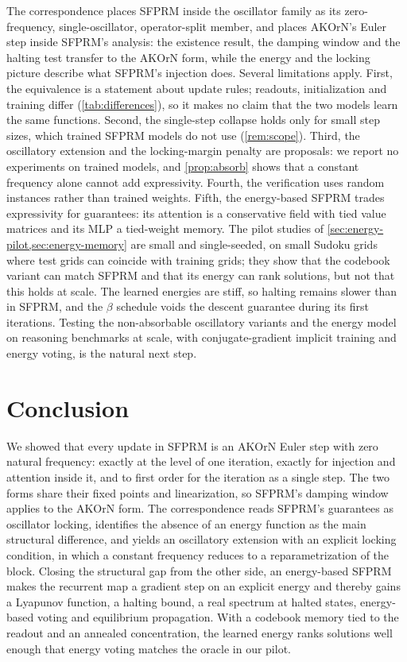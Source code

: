 \documentclass{article}
\theoremstyle{plain}
\theoremstyle{definition}
\theoremstyle{remark}
\begin{document}
The correspondence places SFPRM inside the oscillator family as its zero-frequency, single-oscillator,
operator-split member, and places AKOrN's Euler step inside SFPRM's analysis: the existence result,
the damping window and the halting test transfer to the AKOrN form, while the energy and the locking
picture describe what SFPRM's injection does. Several limitations apply. First, the equivalence is a
statement about update rules; readouts, initialization and training differ (\cref{tab:differences}),
so it makes no claim that the two models learn the same functions. Second, the single-step collapse
holds only for small step sizes, which trained SFPRM models do not use (\cref{rem:scope}). Third, the
oscillatory extension and the locking-margin penalty are proposals: we report no experiments on
trained models, and \cref{prop:absorb} shows that a constant frequency alone cannot add expressivity.
Fourth, the verification uses random instances rather than trained weights. Fifth, the energy-based
SFPRM trades expressivity for guarantees: its attention is a conservative field with tied value
matrices and its MLP a tied-weight memory. The pilot studies of \cref{sec:energy-pilot,sec:energy-memory}
are small and single-seeded, on small Sudoku grids where test grids can coincide with training
grids; they show that the codebook variant can match SFPRM and that its energy can rank solutions,
but not that this holds at scale. The learned energies are stiff, so halting remains slower than in
SFPRM, and the $\beta$ schedule voids the descent guarantee during its first iterations. Testing the non-absorbable oscillatory variants and the energy model on
reasoning benchmarks at scale, with conjugate-gradient implicit training and energy voting, is the
natural next step.

\section{Conclusion}
\label{sec:conclusion}

We showed that every update in SFPRM is an AKOrN Euler step with zero natural frequency: exactly at
the level of one iteration, exactly for injection and attention inside it, and to first order for the
iteration as a single step. The two forms share their fixed points and linearization, so SFPRM's
damping window applies to the AKOrN form. The correspondence reads SFPRM's guarantees as oscillator
locking, identifies the absence of an energy function as the main structural difference, and yields
an oscillatory extension with an explicit locking condition, in which a constant frequency reduces to
a reparametrization of the block. Closing the structural gap from the other side, an energy-based
SFPRM makes the recurrent map a gradient step on an explicit energy and thereby gains a Lyapunov
function, a halting bound, a real spectrum at halted states, energy-based voting and equilibrium
propagation. With a codebook memory tied to the readout and an annealed concentration, the learned
energy ranks solutions well enough that energy voting matches the oracle in our pilot.
\end{document}
